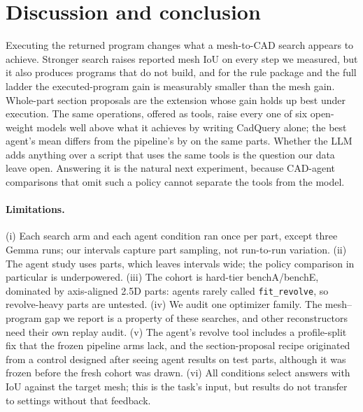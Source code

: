 \section{Discussion and conclusion}
\label{sec:discussion}

Executing the returned program changes what a mesh-to-CAD search appears to achieve. Stronger search raises reported mesh IoU on every step we measured, but it also produces programs that do not build, and for the rule package and the full ladder the executed-program gain is measurably smaller than the mesh gain. Whole-part section proposals are the extension whose gain holds up best under execution. The same operations, offered as tools, raise every one of six open-weight models well above what it achieves by writing CadQuery alone; the best agent's mean differs from the pipeline's by \mGemmaVsPipeDiff{} on the same parts. Whether the LLM adds anything over a script that uses the same tools is the question our data leave open. Answering it is the natural next experiment, because CAD-agent comparisons that omit such a policy cannot separate the tools from the model.

\paragraph{Limitations.}
(i) Each search arm and each agent condition ran once per part, except three Gemma runs; our intervals capture part sampling, not run-to-run variation. (ii) The agent study uses \nAgentParts{} parts, which leaves intervals wide; the policy comparison in particular is underpowered. (iii) The cohort is hard-tier benchA/benchE, dominated by axis-aligned 2.5D parts: agents rarely called \texttt{fit\_revolve}, so revolve-heavy parts are untested. (iv) We audit one optimizer family. The mesh--program gap we report is a property of these searches, and other reconstructors need their own replay audit. (v) The agent's revolve tool includes a profile-split fix that the frozen pipeline arms lack, and the section-proposal recipe originated from a control designed after seeing agent results on test parts, although it was frozen before the fresh cohort was drawn. (vi) All conditions select answers with IoU against the target mesh; this is the task's input, but results do not transfer to settings without that feedback.
